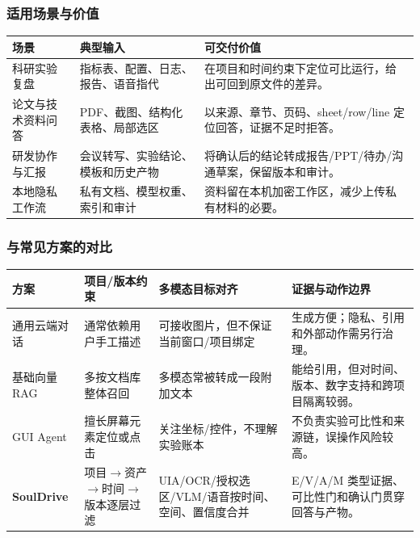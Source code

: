 \documentclass[UTF8,12pt]{ctexart}
\begin{document}
\subsubsection{适用场景与价值}
\begin{center}
\small
\begin{tabularx}{\textwidth}{>{\raggedright\arraybackslash}p{}
  >{\raggedright\arraybackslash}p{}X}
\toprule
场景 & 典型输入 & 可交付价值\\
\midrule
科研实验复盘 & 指标表、配置、日志、报告、语音指代 & 在项目和时间约束下定位可比运行，给出可回到原文件的差异。\\
论文与技术资料问答 & PDF、截图、结构化表格、局部选区 & 以来源、章节、页码、sheet/row/line 定位回答，证据不足时拒答。\\
研发协作与汇报 & 会议转写、实验结论、模板和历史产物 & 将确认后的结论转成报告/PPT/待办/沟通草案，保留版本和审计。\\
本地隐私工作流 & 私有文档、模型权重、索引和审计 & 资料留在本机加密工作区，减少上传私有材料的必要。\\
\bottomrule
\end{tabularx}
\end{center}

\subsubsection{与常见方案的对比}
\begin{center}
\scriptsize
\begin{tabularx}{\textwidth}{>{\raggedright\arraybackslash}p{}
  >{\raggedright\arraybackslash}p{}
  >{\raggedright\arraybackslash}p{}
  X}
\toprule
方案 & 项目/版本约束 & 多模态目标对齐 & 证据与动作边界\\
\midrule
通用云端对话 & 通常依赖用户手工描述 & 可接收图片，但不保证当前窗口/项目绑定 & 生成方便；隐私、引用和外部动作需另行治理。\\
基础向量 RAG & 多按文档库整体召回 & 多模态常被转成一段附加文本 & 能给引用，但对时间、版本、数字支持和跨项目隔离较弱。\\
GUI Agent & 擅长屏幕元素定位或点击 & 关注坐标/控件，不理解实验账本 & 不负责实验可比性和来源链，误操作风险较高。\\
\textbf{SoulDrive} & 项目$\rightarrow$资产$\rightarrow$时间$\rightarrow$版本逐层过滤 & UIA/OCR/授权选区/VLM/语音按时间、空间、置信度合并 & E/V/A/M 类型证据、可比性门和确认门贯穿回答与产物。\\
\bottomrule
\end{tabularx}
\end{center}
\end{document}
